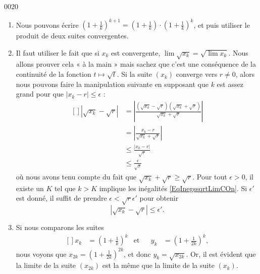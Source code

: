 \begin{corrige}{0020}
\begin{enumerate}
\begin{enumerate}
\item Nous pouvons écrire $\left( 1+\frac{1}{ k } \right)^{k+1}=\left( 1+\frac{1}{ k } \right)\cdot\left( 1+\frac{1}{ k } \right)^{k}$, et puis utiliser le produit de deux suites convergentes.
\item Il faut utiliser le fait que si $x_k$ est convergente, $\lim\sqrt{x_k}=\sqrt{\lim x_k}$. Nous allons prouver cela « à la main » mais sachez que c'est une conséquence de la continuité de la fonction $t\mapsto\sqrt{t}$. Si la suite $(x_k)$ converge vers $r\neq 0$, alors nous pouvons faire la manipulation suivante en supposant que $k$ est assez grand pour que $| x_k-r |\leq\epsilon$ :
\begin{equation}		\label{EqInegssqrtLimCOn}
	\begin{aligned}[]
		| \sqrt{x_k}-\sqrt{r} |	&=\left|  \frac{ (\sqrt{x_k}-\sqrt{r})(\sqrt{x_k}+\sqrt{r}) }{ \sqrt{x_k}+\sqrt{r} }  \right|\\
					&=\left| \frac{ x_k-r }{ \sqrt{x_k}+\sqrt{r} } \right| \\
					&\leq\frac{ | x_k-r | }{ \sqrt{r} }\\
					&\leq \frac{ \epsilon }{ \sqrt{r} }
	\end{aligned}
\end{equation}
où nous avons tenu compte du fait que $\sqrt{x_k}+\sqrt{r}\geq\sqrt{r}$. Pour tout $\epsilon>0$, il existe un $K$ tel que $k>K$ implique les inégalités \eqref{EqInegssqrtLimCOn}. Si $\epsilon'$ est donné, il suffit de prendre $\epsilon< \sqrt{r}\epsilon'$ pour obtenir
\begin{equation}
	| \sqrt{x_k}-\sqrt{r} |\leq\epsilon'.
\end{equation}
\item
Si nous comparons les suites
\begin{equation}
	\begin{aligned}[]
		x_k&=\left( 1+\frac{1}{ k } \right)^k&\text{et}&&y_k&=\left( 1+\frac{1}{ 2k } \right)^k,
	\end{aligned}
\end{equation}
nous voyons que $x_{2k}=\left( 1+\frac{1}{ 2k } \right)^{2k}$, et donc $y_k=\sqrt{x_{2k}}$. Or, il est évident que la limite de la suite $(x_{2k})$ est la même que la limite de la suite $(x_k)$.


\end{enumerate}
\end{enumerate}
\end{corrige}
